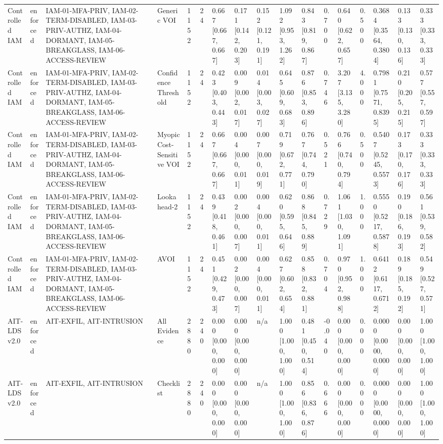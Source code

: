 \begin{table}[!ht]
{\begin{tabular}{lllllllllllllllll}
Controlled IAM & enforced & IAM-01-MFA-PRIV, IAM-02-TERM-DISABLED, IAM-03-PRIV-AUTHZ, IAM-04-DORMANT, IAM-05-BREAKGLASS, IAM-06-ACCESS-REVIEW & Generic VOI & 1152 & 24 & 0.667 [0.667, 0.667] & 0.171 [0.142, 0.203] & 0.152 [0.121, 0.191] & 1.092 [0.953, 1.262] & 0.843 [0.819, 0.867] & 0.700 & 0.640 [0.622, 0.657] & 0.500 & 0.3684 [0.3564, 0.3804] & 0.133 [0.130, 0.136] & 0.333 [0.333, 0.333] \\
Controlled IAM & enforced & IAM-01-MFA-PRIV, IAM-02-TERM-DISABLED, IAM-03-PRIV-AUTHZ, IAM-04-DORMANT, IAM-05-BREAKGLASS, IAM-06-ACCESS-REVIEW & Confidence Threshold & 1152 & 24 & 0.423 [0.403, 0.443] & 0.009 [0.002, 0.017] & 0.014 [0.003, 0.027] & 0.645 [0.609, 0.683] & 0.876 [0.853, 0.896] & 0.746 & 3.207 [3.135, 3.280] & 4.000 & 0.7981 [0.7571, 0.8395] & 0.210 [0.205, 0.215] & 0.577 [0.557, 0.597] \\
Controlled IAM & enforced & IAM-01-MFA-PRIV, IAM-02-TERM-DISABLED, IAM-03-PRIV-AUTHZ, IAM-04-DORMANT, IAM-05-BREAKGLASS, IAM-06-ACCESS-REVIEW & Myopic Cost-Sensitive VOI & 1152 & 24 & 0.667 [0.667, 0.667] & 0.004 [0.000, 0.011] & 0.007 [0.000, 0.019] & 0.719 [0.672, 0.771] & 0.767 [0.744, 0.790] & 0.521 & 0.766 [0.740, 0.794] & 0.500 & 0.5407 [0.5245, 0.5573] & 0.173 [0.170, 0.176] & 0.333 [0.333, 0.333] \\
Controlled IAM & enforced & IAM-01-MFA-PRIV, IAM-02-TERM-DISABLED, IAM-03-PRIV-AUTHZ, IAM-04-DORMANT, IAM-05-BREAKGLASS, IAM-06-ACCESS-REVIEW & Lookahead-2 & 1152 & 24 & 0.439 [0.418, 0.461] & 0.002 [0.000, 0.007] & 0.004 [0.000, 0.011] & 0.620 [0.595, 0.646] & 0.868 [0.845, 0.889] & 0.729 & 1.061 [1.030, 1.091] & 1.000 & 0.5550 [0.5217, 0.5878] & 0.190 [0.186, 0.193] & 0.561 [0.539, 0.582] \\
Controlled IAM & enforced & IAM-01-MFA-PRIV, IAM-02-TERM-DISABLED, IAM-03-PRIV-AUTHZ, IAM-04-DORMANT, IAM-05-BREAKGLASS, IAM-06-ACCESS-REVIEW & AVOI & 1152 & 24 & 0.451 [0.429, 0.473] & 0.002 [0.000, 0.007] & 0.004 [0.000, 0.011] & 0.627 [0.602, 0.654] & 0.858 [0.832, 0.881] & 0.704 & 0.970 [0.952, 0.988] & 1.000 & 0.6412 [0.6117, 0.6712] & 0.189 [0.185, 0.192] & 0.549 [0.527, 0.571] \\
AIT-LDS v2.0 & enforced & AIT-EXFIL, AIT-INTRUSION & All Evidence & 2880 & 240 & 0.000 [0.000, 0.000] & 0.000 [0.000, 0.000] & n/a & 1.000 [1.000, 1.000] & 0.481 [0.450, 0.514] & -0.040 & 0.000 [0.000, 0.000] & 0.000 & 0.0000 [0.0000, 0.0000] & 0.000 [0.000, 0.000] & 1.000 [1.000, 1.000] \\
AIT-LDS v2.0 & enforced & AIT-EXFIL, AIT-INTRUSION & Checklist & 2880 & 240 & 0.000 [0.000, 0.000] & 0.000 [0.000, 0.000] & n/a & 1.000 [1.000, 1.000] & 0.856 [0.836, 0.876] & 0.666 & 0.000 [0.000, 0.000] & 0.000 & 0.0000 [0.0000, 0.0000] & 0.000 [0.000, 0.000] & 1.000 [1.000, 1.000] \\

\end{tabular}}
\end{table}
